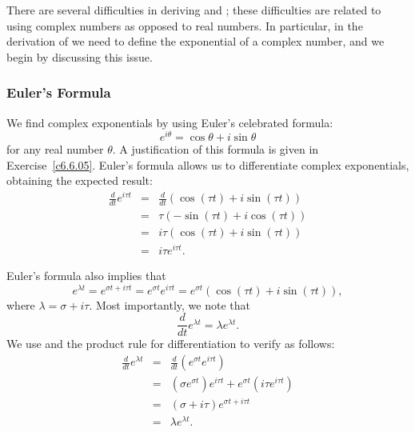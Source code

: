 There are several difficulties in deriving  and ; these
difficulties are related to using complex numbers as opposed to real numbers.
In particular, in the derivation of  we need to define the
exponential of a complex number, and we begin by discussing this issue.

\subsubsection*{Euler's Formula}

We find complex exponentials by using Euler's celebrated formula:
\begin{equation}  \label{E:Euler}
e^{i\theta} = \cos\theta + i\sin\theta
\end{equation}
for any real number $\theta$.  A justification of this formula is
given in Exercise~\ref{c6.6.05}.   Euler's formula allows us to differentiate
complex exponentials, obtaining the expected result:
\begin{eqnarray*}
\frac{d}{dt}e^{i\tau t} & = &
\frac{d}{dt}(\cos(\tau t) + i\sin(\tau t))\\
& = & \tau(-\sin(\tau t) + i\cos(\tau t)) \\
& = & i\tau(\cos(\tau t) + i\sin(\tau t))\\
& = & i\tau e^{i\tau t}.
\end{eqnarray*}

Euler's formula also implies that
\begin{equation}  \label{E:ecis}
e^{\lambda t} = e^{\sigma t + i\tau t} = e^{\sigma t}e^{i\tau t} =
e^{\sigma t}(\cos(\tau t) + i\sin(\tau t)),
\end{equation}
where $\lambda = \sigma+i\tau$.  Most importantly, we note that
\begin{equation}  \label{E:eldiff}
\frac{d}{dt}e^{\lambda t} = \lambda e^{\lambda t}.
\end{equation}
We use  and the product rule for differentiation to verify
 as follows:
\begin{eqnarray*}
\frac{d}{dt}e^{\lambda t} & =  &
\frac{d}{dt}\left(e^{\sigma t}e^{i\tau t}\right)\\
& = & \left(\sigma e^{\sigma t}\right)e^{i\tau t}
+ e^{\sigma t}\left(i\tau e^{i\tau t}\right)\\
& = & (\sigma+i\tau)e^{\sigma t + i\tau t} \\
& = & \lambda e^{\lambda t}.
\end{eqnarray*}

